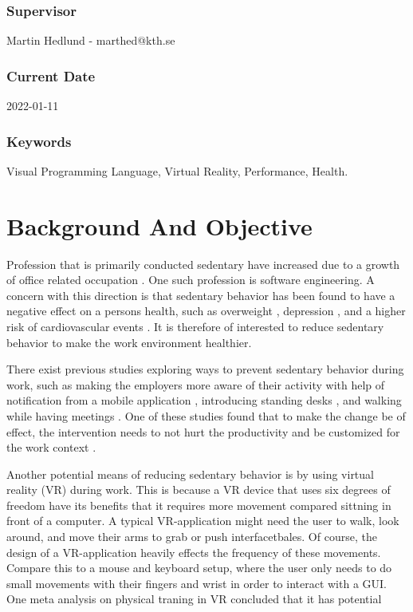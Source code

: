 \documentclass{sigchi}
\begin{document}
\subsubsection{Supervisor} 
Martin Hedlund - marthed@kth.se

\subsubsection{Current Date} 
2022-01-11

\subsubsection{Keywords} 
Visual Programming Language, Virtual Reality, Performance, Health.

\section{Background And Objective}

Profession that is primarily conducted sedentary have increased due to a growth of office related occupation \cite{parry_contribution_2013}. One such profession is software engineering. A concern with this direction is that sedentary behavior has been found to have a negative effect on a persons health, such as overweight \cite{lakdawalla_labor_2007}, depression \cite{zhai_sedentary_2015}, and a higher risk of cardiovascular events \cite{straker_sedentary_2016}. It is therefore of interested to reduce sedentary behavior to make the work environment healthier.

There exist previous studies exploring ways to prevent sedentary behavior during work, such as making the employers more aware of their activity with help of notification from a mobile application \cite{cole_they_2015}, introducing standing desks \cite{pronk_reducing_2012}, and walking while having meetings \cite{bort-roig_uptake_2014}. One of these studies found that to make the change be of effect, the intervention needs to not hurt the productivity and be customized for the work context \cite{bort-roig_uptake_2014}. 


Another potential means of reducing sedentary behavior is by using virtual reality (VR) during work. This is because a VR device that uses six degrees of freedom have its benefits that it requires more movement compared sittning in front of a computer. A typical VR-application might need the user to walk, look around, and move their arms to grab or push interfacetbales. Of course, the design of a VR-application heavily effects the frequency of these movements. Compare this to a mouse and keyboard setup, where the user only needs to do small movements with their fingers and wrist in order to interact with a GUI. One meta analysis on physical traning in VR concluded that it has potential \cite{ng_effectiveness_2019}
\end{document}
